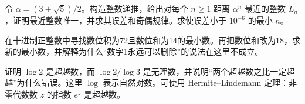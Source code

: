 令 $\alpha=(3+\sqrt5)/2$。构造整数递推，给出对每个 $n\ge1$ 距离 $\alpha^n$ 最近的整数 $L_n$，证明最近整数唯一，并求其误差和奇偶规律。求使误差小于 $10^{-6}$ 的最小 $n$。

在十进制正整数中寻找数位积为72且数位和为14的最小数。再把数位和改为18，求新的最小数，并解释为什么“数字1永远可以删除”的说法在这里不成立。

证明 $\log2$ 是超越数，而 $\log2/\log3$ 是无理数，并说明“两个超越数之比一定超越”为什么错误。这里 $\log$ 表示自然对数。可使用 Hermite--Lindemann 定理：非零代数数 $z$ 的指数 $e^z$ 是超越数。
